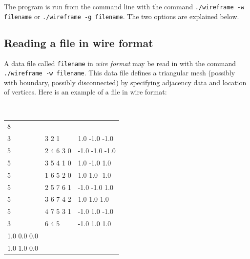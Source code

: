 \documentclass[12pt]{article}
\begin{document}
The program is run from the command line with the command {\tt ./wireframe -w filename}
or {\tt ./wireframe -g filename}. The two options are explained below.

\subsection{Reading a file in wire format}

A data file called {\tt filename} in {\em wire format} may be read in with the command 
{\tt ./wireframe -w filename}. This data file defines a triangular mesh (possibly with
boundary, possibly disconnected) by specifying adjacency data and location of vertices. 
Here is an example of a file in wire format:

\begin{center}
{\tt
\begin{tabular}{lll}
8 & & \\
3 & 3 2 1 &	1.0 -1.0 -1.0 \\
5 & 2 4 6 3 0 & -1.0 -1.0 -1.0 \\
5 & 3 5 4 1 0 & 1.0 -1.0 1.0 \\
5 & 1 6 5 2 0 & 1.0 1.0 -1.0 \\
5 & 2 5 7 6 1 & -1.0 -1.0 1.0 \\
5 & 3 6 7 4 2 & 1.0 1.0 1.0 \\
5 & 4 7 5 3 1 & -1.0 1.0 -1.0 \\
3 & 6 4 5 & -1.0 1.0 1.0 \\
1.0 0.0 0.0 & & \\
1.0 1.0 0.0 & &
\end{tabular}
}
\end{center}
\end{document}
